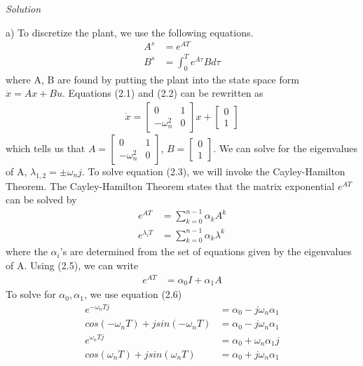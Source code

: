 \documentclass{article}
\begin{document}
  \noindent \textit{Solution}
 
  a) To discretize the plant, we use the following equations.
  \begin{align*}
	  A^s&=e^{AT} \tag{2.3} \\
	  B^s&=\int_0^Te^{A\tau}Bd\tau \tag{2.4}
  \end{align*}
  where A, B are found by putting the plant into the state space form $\dot{x}=Ax+Bu$.
  Equations (2.1) and (2.2) can be rewritten as 
  \begin{align*}
	  \dot{x}=
	  \begin{bmatrix}
		  0 & 1 \\
		  -\omega_n^2 & 0
	  \end{bmatrix}x + 
	  \begin{bmatrix}
		  0 \\
		  1 
	  \end{bmatrix}
  \end{align*}
  which tells us that $A=
  \begin{bmatrix}
	  0 & 1 \\
	  -\omega_n^2 & 0
  \end{bmatrix}$, $B=
  \begin{bmatrix}
         0 \\
         1 
  \end{bmatrix}$.
  We can solve for the eigenvalues of A, $\lambda_{1,2}=\pm\omega_nj$. \newline
  To solve equation (2.3), we will invoke the Cayley-Hamilton Theorem. The Cayley-Hamilton Theorem states that the matrix exponential $e^{AT}$ can be solved by 
  \begin{align*}
	  e^{AT}&=\sum_{k=0}^{n-1}\alpha_kA^k \tag{2.5} \\
	  e^{\lambda_iT}&=\sum_{k=0}^{n-1}\alpha_k\lambda^k \tag{2.6}
  \end{align*}
  where the $\alpha_i$’s are determined from the set of equations given by the eigenvalues of A. \newline
  Using (2.5), we can write 
  \begin{align*}
	  e^{AT}&=\alpha_0I+\alpha_1A
  \end{align*}
  To solve for $\alpha_0, \alpha_1$, we use equation (2.6)
  \begin{align*}
	  e^{-\omega_nTj}&=\alpha_0-j\omega_n\alpha_1 \\
	  cos(-\omega_nT)+jsin(-\omega_nT)&=\alpha_0-j\omega_n\alpha_1 \tag{2.7} \\
	  e^{\omega_nTj}&=\alpha_0+\omega_n\alpha_1j \\
	  cos(\omega_nT)+jsin(\omega_nT)&=\alpha_0+j\omega_n\alpha_1 \tag{2.8}
  \end{align*}
\end{document}
